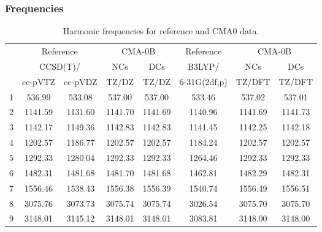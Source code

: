 \documentclass[10pt,oneside]{article}
\begin{document}
\subsubsection*{Frequencies}
\begin{table}[h!]
\centering
\caption{Harmonic frequencies for reference and CMA0 data.}
\begin{tabular}{cccccccc}
\toprule
{} & \multicolumn{2}{c}{Reference} & \multicolumn{2}{c}{CMA-0B} &    Reference & \multicolumn{2}{c}{CMA-0B} \\
{} & \multicolumn{2}{c}{CCSD(T)/} &     NCs &     DCs &       B3LYP/ &     NCs &     DCs \\
{} &   cc-pVTZ & cc-pVDZ &   TZ/DZ &   TZ/DZ & 6-31G(2df,p) &  TZ/DFT &  TZ/DFT \\
\midrule
1 &    536.99 &  533.08 &  537.00 &  537.00 &       533.46 &  537.02 &  537.01 \\
2 &   1141.59 & 1131.60 & 1141.70 & 1141.69 &      1140.96 & 1141.69 & 1141.73 \\
3 &   1142.17 & 1149.36 & 1142.83 & 1142.83 &      1141.45 & 1142.25 & 1142.18 \\
4 &   1202.57 & 1186.77 & 1202.57 & 1202.57 &      1184.24 & 1202.57 & 1202.57 \\
5 &   1292.33 & 1280.04 & 1292.33 & 1292.33 &      1264.46 & 1292.33 & 1292.33 \\
6 &   1482.31 & 1481.68 & 1481.70 & 1481.68 &      1462.81 & 1482.29 & 1482.31 \\
7 &   1556.46 & 1538.43 & 1556.38 & 1556.39 &      1540.74 & 1556.49 & 1556.51 \\
8 &   3075.76 & 3073.73 & 3075.74 & 3075.74 &      3026.54 & 3075.70 & 3075.70 \\
9 &   3148.01 & 3145.12 & 3148.01 & 3148.01 &      3083.81 & 3148.00 & 3148.00 \\
\bottomrule
\end{tabular}
\end{table}

\clearpage
\end{document}
